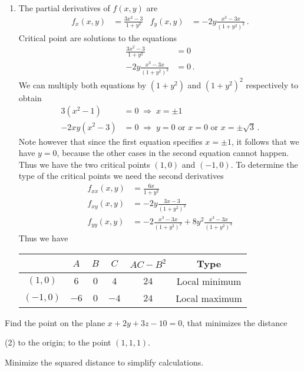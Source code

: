 \begin{solution}
\begin{enumerate}
\item
The partial derivatives of $f(x,y)$ are
\begin{align*}
f_x(x,y) &= \frac{3x^2-3}{1+y^2} &
f_y(x,y) &= -2y \frac{x^3-3x}{\left(1+y^2\right)^2} \,.
\end{align*}
Critical point are solutions to the equations
\begin{align*}
\frac{3x^2-3}{1+y^2} &= 0 \\
-2y \frac{x^3-3x}{\left(1+y^2\right)^2} &= 0\,.
\end{align*}
We can multiply both equations by $(1+y^2)$ and $\left(1+y^2\right)^2$ respectively to obtain
\begin{align*}
3\left(x^2 - 1\right) &= 0\;\Rightarrow\; x = \pm 1 \\
-2xy\left(x^2 - 3 \right) &= 0\;\Rightarrow\; y = 0 \text{ or }x = 0 \text{ or } x = \pm \sqrt{3}\,.
\end{align*}
Note however that since the first equation specifies $x= \pm 1$, it follows that we have $y=0$, because the other cases in the second equation cannot happen. Thus we have the two critical points $(1,0)$ and $(-1,0)$. To determine the type of the critical points we need the second derivatives
\begin{align*}
f_{xx}(x,y) &= \frac{6x}{1+y^2}\\
f_{xy}(x,y) &= -2y \frac{3x-3}{\left(1 + y^2\right)^2}\\
f_{yy}(x,y) &= -2\frac{x^3-3x}{\left(1+y^2\right)^2} +8y^2 \frac{x^3-3x}{\left(1+y^2\right)^3}
\end{align*}
Thus we have
\begin{center}
\renewcommand{\arraystretch}{1.25}
\begin{tabular}{c|ccc|cc}
 & $A$ & $B$ & $C$ & $AC-B^2$ & Type \\ \hline
$\left(1, 0\right)$ & $6$ & $0$ & $4$ & $24$ & Local minimum \\
$\left(-1, 0\right)$ & $-6$ & $0$ & $-4$ & $24$ & Local maximum
\end{tabular}
\end{center}
\end{enumerate}
\end{solution}

\begin{question}
Find the point on the plane $x+2y+3z-10=0$, that minimizes the distance
\begin{tasks}(2)
\task
to the origin;
\task
to the point $(1,1,1)$.
\end{tasks}

\begin{hint*}
Minimize the squared distance to simplify calculations.
\end{hint*}
\end{question}

